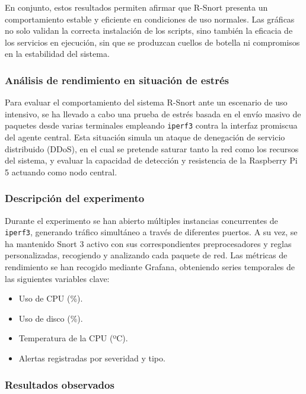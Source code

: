 \documentclass[11pt,a4paper,twoside]{report}
\begin{document}
En conjunto, estos resultados permiten afirmar que R-Snort presenta un comportamiento estable y eficiente en condiciones de uso normales. Las gráficas no solo validan la correcta instalación de los scripts, sino también la eficacia de los servicios en ejecución, sin que se produzcan cuellos de botella ni compromisos en la estabilidad del sistema.

\subsubsection{Análisis de rendimiento en situación de estrés}

Para evaluar el comportamiento del sistema R-Snort ante un escenario de uso intensivo, se ha llevado a cabo una prueba de estrés basada en el envío masivo de paquetes desde varias terminales empleando \texttt{iperf3} contra la interfaz promiscua del agente central. Esta situación simula un ataque de denegación de servicio distribuido (DDoS), en el cual se pretende saturar tanto la red como los recursos del sistema, y evaluar la capacidad de detección y resistencia de la Raspberry Pi 5 actuando como nodo central.

\subsubsection*{Descripción del experimento}
Durante el experimento se han abierto múltiples instancias concurrentes de \texttt{iperf3}, generando tráfico simultáneo a través de diferentes puertos. A su vez, se ha mantenido Snort 3 activo con sus correspondientes preprocesadores y reglas personalizadas, recogiendo y analizando cada paquete de red. Las métricas de rendimiento se han recogido mediante Grafana, obteniendo series temporales de las siguientes variables clave:

\begin{itemize}
	\item Uso de CPU (\%).
	\item Uso de disco (\%).
	\item Temperatura de la CPU (ºC).
	\item Alertas registradas por severidad y tipo.
\end{itemize}

\subsubsection*{Resultados observados}
\end{document}
